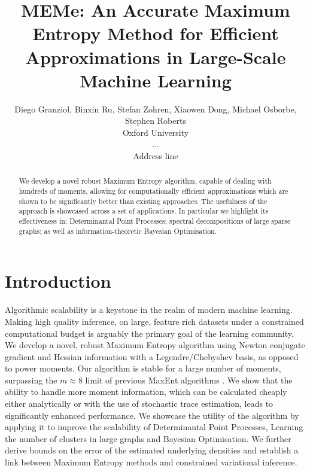 \documentclass[letterpaper]{article} %
\begin{document}
%
\title{MEMe: An Accurate Maximum Entropy Method for Efficient Approximations in Large-Scale Machine Learning}
\author{Diego Granziol, Binxin Ru, Stefan Zohren, Xiaowen Dong, Michael Osborbe, Stephen Roberts\\ 
	Oxford University \\ ... \\ Address line}

\maketitle
\begin{abstract}
We develop a novel robust Maximum Entropy algorithm, capable of dealing with hundreds of moments, allowing for computationally efficient approximations which are shown to be significantly better than existing approaches. The usefulness of the approach is showcased across a set of applications. In particular we highlight its effectiveness in: Determinantal Point Processes; spectral decompositions of large sparse graphs; as well as information-theoretic Bayesian Optimisation.
\end{abstract}


\section{Introduction}

Algorithmic scalability is a keystone in the realm of modern machine learning. Making high quality inference, on large, feature rich datasets under a constrained computational budget is arguably the primary goal of the learning community. 
We develop a novel, robust Maximum Entropy algorithm using Newton conjugate gradient and Hessian information with a Legendre/Chebyshev basis, as opposed to power moments. Our algorithm is stable for a large number of moments, surpassing the $m \approx 8$ limit of previous MaxEnt algorithms \cite{DBLP:conf/bigdataconf/GranziolR17,bandyopadhyay2005maximum,mead1984maximum}. We show that the ability to handle more moment information, which can be calculated cheaply either analytically or with the use of stochastic trace estimation, leads to significantly enhanced performance. We showcase the utility of the algorithm by applying it to improve the scalability of Determinantal Point Processes, Learning the number of clusters in large graphs and Bayesian Optimisation. We further derive bounds on the error of the estimated underlying densities and establish a link between Maximum Entropy methods and constrained variational inference. 
\end{document}
